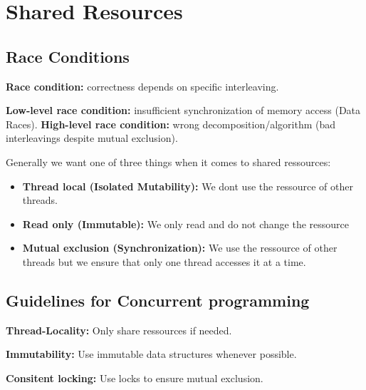 \section{Shared Resources}

\subsection{Race Conditions}

\begin{definition}
\textbf{Race condition: } correctness depends on specific interleaving.
\end{definition}

\begin{definition}
\textbf{Low-level race condition: } insufficient synchronization of memory access (Data Races).
\textbf{High-level race condition: } wrong decomposition/algorithm (bad interleavings despite mutual exclusion).
\end{definition}

Generally we want one of three things when it comes to shared ressources:
\begin{itemize}
    \item \textbf{Thread local (Isolated Mutability):} We dont use the ressource of other threads.
    \item \textbf{Read only (Immutable):} We only read and do not change the ressource
    \item \textbf{Mutual exclusion (Synchronization):} We use the ressource of other threads but we ensure that only one thread accesses it at a time.
\end{itemize}

\subsection{Guidelines for Concurrent programming}

\begin{important}
\textbf{Thread-Locality:} Only share ressources if needed.
\end{important}

\begin{important}
\textbf{Immutability:} Use immutable data structures whenever possible.
\end{important}

\begin{important}
\textbf{Consitent locking:} Use locks to ensure mutual exclusion.
\end{important}


